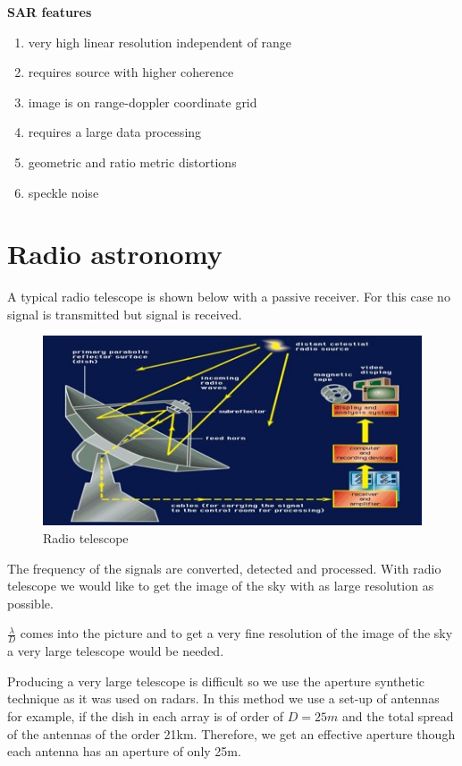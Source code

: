 \textbf{SAR features}
\begin{enumerate}
\itemsep0em
\item very high linear resolution independent of range
\item requires source with higher coherence
\item image is on range-doppler coordinate grid
\item requires a large data processing
\item geometric and ratio metric distortions
\item speckle noise
\end{enumerate}

\section{Radio astronomy} 

A typical radio telescope is shown below with a passive receiver. For this case no signal is transmitted but signal is received.\\
\begin{figure}[h]
\centering
\includegraphics[scale=0.5]{./graphics/Radio-Telescope-0}
\caption{Radio telescope}
\end{figure}

The frequency of the signals are converted, detected and processed. With radio telescope we would like to get the image of the sky with as large resolution as possible.

$\frac{\lambda}{D}$ comes into the picture and to get a very fine resolution of the image of the sky a very large telescope would be needed.

Producing a very large telescope is difficult so we use the aperture synthetic technique as it was used on radars. In this method we use a set-up of antennas for example, if the dish in each array is of order of $ D = 25m $ and the total spread of the antennas of the order 21km. Therefore, we get an effective aperture though each antenna has an aperture of only 25m.

